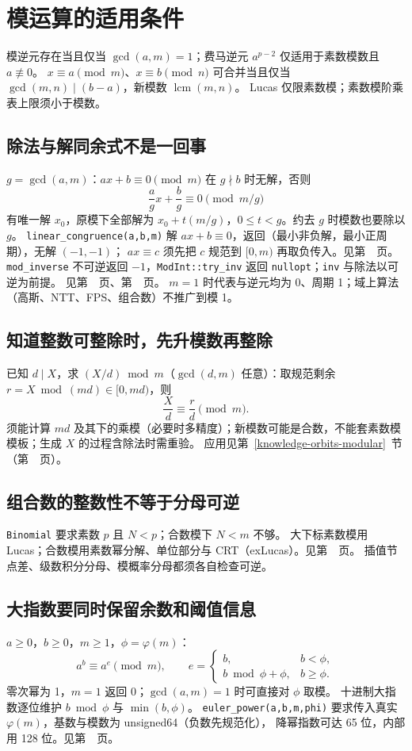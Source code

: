 \section{模运算的适用条件}\label{knowledge-modular-conditions}
模逆元存在当且仅当 $\gcd(a,m)=1$；费马逆元 $a^{p-2}$ 仅适用于素数模数且 $a\not\equiv0$。
$x\equiv a\pmod m$、$x\equiv b\pmod n$ 可合并当且仅当 $\gcd(m,n)\mid(b-a)$，新模数 $\operatorname{lcm}(m,n)$。
Lucas 仅限素数模；素数模阶乘表上限须小于模数。

\subsection{除法与解同余式不是一回事}
$g=\gcd(a,m)$：$ax+b\equiv0\pmod m$ 在 $g\nmid b$ 时无解，否则
\[
\frac ag x+\frac bg\equiv0\pmod{m/g}
\]
有唯一解 $x_0$，原模下全部解为 $x_0+t(m/g)$，$0\le t<g$。约去 $g$ 时模数也要除以 $g$。
\texttt{linear\_congruence(a,b,m)} 解 $ax+b\equiv0$，返回（最小非负解，最小正周期），无解 $(-1,-1)$；
$ax\equiv c$ 须先把 $c$ 规范到 $[0,m)$ 再取负传入。见第~\pageref{compact-linear_congruence}~页。
\texttt{mod\_inverse} 不可逆返回 $-1$，\texttt{ModInt::try\_inv} 返回 \texttt{nullopt}；\texttt{inv} 与除法以可逆为前提。
见第~\pageref{compact-mod_inverse}~页、第~\pageref{compact-ModInt}~页。
$m=1$ 时代表与逆元均为 0、周期 1；域上算法（高斯、NTT、FPS、组合数）不推广到模 1。

\subsection{知道整数可整除时，先升模数再整除}
已知 $d\mid X$，求 $(X/d)\bmod m$（$\gcd(d,m)$ 任意）：取规范剩余 $r=X\bmod(md)\in[0,md)$，则
\[
\frac Xd\equiv\frac rd\pmod m.
\]
须能计算 $md$ 及其下的乘模（必要时多精度）；新模数可能是合数，不能套素数模模板；生成 $X$ 的过程含除法时需重验。
应用见第~\ref{knowledge-orbits-modular}~节（第~\pageref{knowledge-orbits-modular}~页）。

\subsection{组合数的整数性不等于分母可逆}
\texttt{Binomial} 要求素数 $p$ 且 $N<p$；合数模下 $N<m$ 不够。
大下标素数模用 Lucas；合数模用素数幂分解、单位部分与 CRT（exLucas）。见第~\pageref{compact-Binomial}~页。
插值节点差、级数积分分母、模概率分母都须各自检查可逆。

\subsection{大指数要同时保留余数和阈值信息}
$a\ge0$，$b\ge0$，$m\ge1$，$\phi=\varphi(m)$：
\[
a^b\equiv a^{e}\pmod m,\qquad
e=\begin{cases}
b,&b<\phi,\\
b\bmod\phi+\phi,&b\ge\phi.
\end{cases}
\]
零次幂为 1，$m=1$ 返回 0；$\gcd(a,m)=1$ 时可直接对 $\phi$ 取模。
十进制大指数逐位维护 $b\bmod\phi$ 与 $\min(b,\phi)$。
\texttt{euler\_power(a,b,m,phi)} 要求传入真实 $\varphi(m)$，基数与模数为 unsigned64（负数先规范化），
降幂指数可达 65 位，内部用 128 位。见第~\pageref{compact-euler_power}~页。
